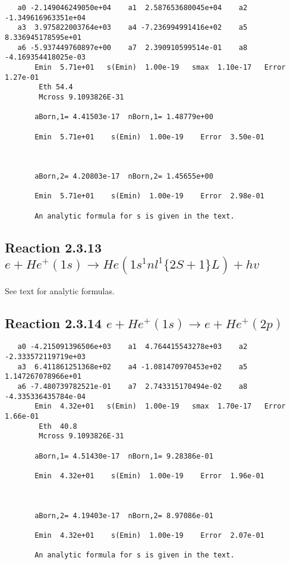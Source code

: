 \documentclass[12pt,dvipdfmx]{article}
\begin{document}
\begin{small}\begin{verbatim}
   a0 -2.149046249050e+04    a1  2.587653680045e+04    a2 -1.349616963351e+04
   a3  3.975822003764e+03    a4 -7.236994991416e+02    a5  8.336945178595e+01
   a6 -5.937449760897e+00    a7  2.390910599514e-01    a8 -4.169354418025e-03
       Emin  5.71e+01   s(Emin)  1.00e-19   smax  1.10e-17   Error  1.27e-01
        Eth 54.4
        Mcross 9.1093826E-31

       aBorn,1= 4.41503e-17  nBorn,1= 1.48779e+00

       Emin  5.71e+01    s(Emin)  1.00e-19    Error  3.50e-01



       aBorn,2= 4.20803e-17  nBorn,2= 1.45655e+00

       Emin  5.71e+01    s(Emin)  1.00e-19    Error  2.98e-01

       An analytic formula for s is given in the text.
\end{verbatim}\end{small}

\newpage
\subsection{
Reaction 2.3.13 $  e + He^+(1s) \rightarrow He(1s^1nl^1  \{2S+1\}L) + hv$}

       See text for analytic formulas.



\newpage
\subsection{
Reaction 2.3.14 $   e + He^+(1s) \rightarrow e + He^+(2p)$}





\begin{small}\begin{verbatim}
   a0 -4.215091396506e+03    a1  4.764415543278e+03    a2 -2.333572119719e+03
   a3  6.411861251368e+02    a4 -1.081470970453e+02    a5  1.147267078966e+01
   a6 -7.480739782521e-01    a7  2.743315170494e-02    a8 -4.335336435784e-04
       Emin  4.32e+01   s(Emin)  1.00e-19   smax  1.70e-17   Error  1.66e-01
        Eth  40.8
        Mcross 9.1093826E-31

       aBorn,1= 4.51430e-17  nBorn,1= 9.28386e-01

       Emin  4.32e+01    s(Emin)  1.00e-19    Error  1.96e-01



       aBorn,2= 4.19403e-17  nBorn,2= 8.97086e-01

       Emin  4.32e+01    s(Emin)  1.00e-19    Error  2.07e-01

       An analytic formula for s is given in the text.
\end{verbatim}\end{small}
\end{document}
